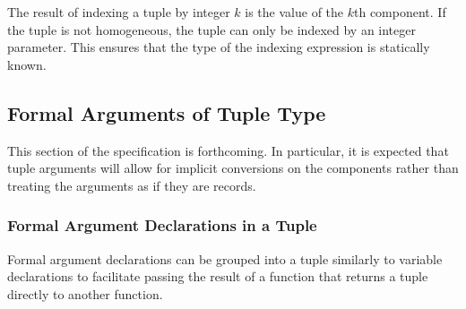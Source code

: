 The result of indexing a tuple by integer $k$ is the value of the
$k$th component.  If the tuple is not homogeneous, the tuple can only
be indexed by an integer parameter.  This ensures that the type of the
indexing expression is statically known.

\subsection{Formal Arguments of Tuple Type}
\label{Formal_Arguments_of_Tuple_Type}


This section of the specification is forthcoming.  In particular, it
is expected that tuple arguments will allow for implicit conversions
on the components rather than treating the arguments as if they are
records.

\subsubsection{Formal Argument Declarations in a Tuple}
\label{Formal_Argument_Declarations_in_a_Tuple}

Formal argument declarations can be grouped into a tuple similarly to
variable declarations to facilitate passing the result of a function that
returns a tuple directly to another function.
